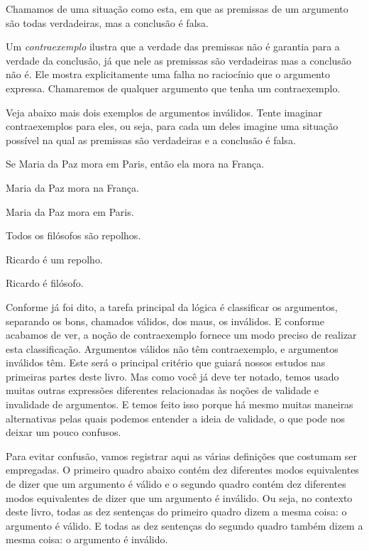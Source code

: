 Chamamos de   uma situação como esta, em que as premissas de um argumento são todas verdadeiras, mas a conclusão é falsa.

Um \textit{contraexemplo} ilustra que a verdade das premissas não é garantia para a verdade da conclusão, já que nele as premissas são verdadeiras mas a conclusão não é.
Ele mostra explicitamente  uma falha no raciocínio que o argumento expressa.
Chamaremos de  qualquer argumento que tenha um contraexemplo.

Veja abaixo mais dois exemplos de argumentos inválidos. Tente imaginar contraexemplos para eles, ou seja, para cada um deles imagine uma situação possível na qual as premissas são verdadeiras e a conclusão é falsa.
\begin{earg}
	\item[] Se Maria da Paz mora em Paris, então ela mora na França.
	\item[] Maria da Paz mora na França.
	\item[\therefore] Maria da Paz mora em Paris.
\end{earg}

\begin{earg}
	\item[] Todos os filósofos são repolhos.
	\item[] Ricardo é um repolho.
	\item[\therefore] Ricardo é filósofo.
\end{earg}
Conforme já foi dito, a tarefa principal da lógica é classificar os argumentos, separando os bons, chamados válidos, dos maus, os inválidos.
E conforme acabamos de ver, a noção de contraexemplo fornece um modo preciso de realizar esta classificação. 
Argumentos válidos não têm contraexemplo, e argumentos inválidos têm.
Este será o principal critério que guiará nossos estudos nas primeiras partes deste livro.
Mas como você já deve ter notado, temos usado muitas outras expressões diferentes relacionadas às noções de validade e invalidade de argumentos.
E temos feito isso porque há mesmo muitas maneiras alternativas pelas quais podemos entender a ideia de validade, o que pode nos deixar um pouco confusos.

Para evitar confusão, vamos registrar aqui as várias definições que costumam ser empregadas.
O primeiro quadro abaixo contém dez diferentes modos equivalentes de dizer que um argumento é válido e o segundo quadro contém dez diferentes modos equivalentes de dizer que um argumento é inválido.
Ou seja, no contexto deste livro, todas as dez sentenças do primeiro quadro dizem a mesma coisa: o argumento é válido.
E todas as dez sentenças do segundo quadro também dizem a mesma coisa: o argumento é inválido.

